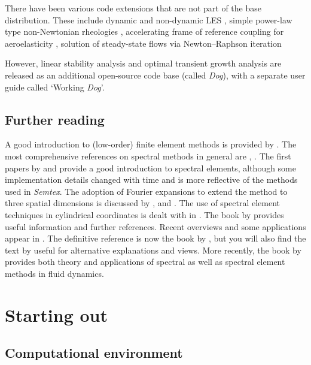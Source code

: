 \documentclass[11pt]{report}
\newcommand{\Semtex}{\emph{Semtex}} \newcommand{\Dog}{\emph{Dog}}
\begin{document}
There have been various code extensions that are not part of the base
distribution. These include dynamic and non-dynamic LES
\citep{blsc03}, simple power-law type non-Newtonian rheologies
\citep{rb06}, accelerating frame of reference coupling for
aeroelasticity \citep{bh96a,bh99,bgw01,hmb03}, solution of
steady-state flows via Newton--Raphson iteration \citep{hmb02a}

However, linear stability analysis
\citep{hmb02a,bllo03b,bllo03a,bml05,shbl05,ebs06,blsh07} and optimal
transient growth analysis \citep{bbs08a} are released as an additional
open-source code base (called \Dog), with a separate user guide
called `Working \Dog'.

\section{Further reading}

A good introduction to (low-order) finite element methods is provided
by \citet{hughes87}.  The most comprehensive references on spectral
methods in general are \citet{gs77}, \citet{chqz88,chqz06}.  The first
papers by \citet{pat84} and \citet{kp86} provide a good introduction
to spectral elements, although some implementation details changed
with time and \citet{mt89} is more reflective of the methods used in
\Semtex.  The adoption of Fourier expansions to extend the method to
three spatial dimensions is discussed by \citet{ap89}, \citet{kar89}
and \citet{kar90}.  The use of spectral element techniques in
cylindrical coordinates is dealt with in \citet{blsh04}.  The book by
\citet{fun97} provides useful information and further references.
Recent overviews and some applications appear in \citet{kh98,hen99b}.
The definitive reference is now the book by \citet{kars05}, but you
will also find the text by \citet*{dfm02} useful for alternative
explanations and views. More recently, the book by \citet{chqz07}
provides both theory and applications of spectral as well as spectral
element methods in fluid dynamics.

\chapter{Starting out}
\label{ch.start}

\section{Computational environment}
\end{document}
